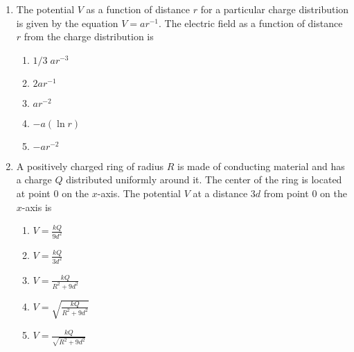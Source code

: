 \documentclass{../../../oss-apphys}
\begin{document}
\begin{multicols}{2}
\begin{enumerate}[leftmargin=18pt,resume]
  \item The potential $V$ as a function of distance $r$ for a particular charge
    distribution is given by the equation $V=ar^{-1}$. The electric field as
    a function of distance $r$ from the charge distribution is
    \begin{enumerate}[noitemsep,topsep=0pt,leftmargin=18pt,label=(\Alph*)]
    \item $1/3\;ar^{-3}$
    \item $2ar^{-1}$
    \item $ar^{-2}$
    \item $-a(\ln r)$
    \item $-ar^{-2}$
    \end{enumerate}
    
  \item A positively charged ring of radius $R$ is made of conducting material
    and has a charge $Q$ distributed uniformly around it. The center of the
    ring is located at point $0$ on the $x$-axis. The potential $V$ at a
    distance $3d$ from point $0$ on the $x$-axis is
    \begin{center}
      \vspace{-.1in}
    \end{center}

    \begin{enumerate}[noitemsep,topsep=0pt,leftmargin=18pt,label=(\Alph*)]  
    \item $\displaystyle V=\frac{kQ}{9d^2}$
    \item $\displaystyle V=\frac{kQ}{3d^2}$
    \item $\displaystyle V=\frac{kQ}{R^2+9d^2}$
    \item $\displaystyle V=\sqrt{\frac{kQ}{R^2+9d^2}}$
    \item $\displaystyle V=\frac{kQ}{\sqrt{R^2+9d^2}}$
    \end{enumerate}
  \end{enumerate}
\end{multicols}
\end{document}
